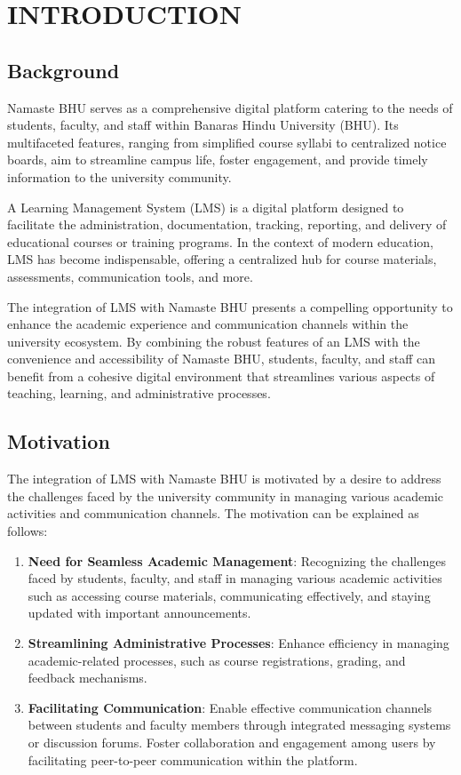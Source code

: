 \newpage
{}
\chapter{INTRODUCTION}



\section{Background}

Namaste BHU serves as a comprehensive digital platform catering to the needs of students, faculty, and staff within Banaras Hindu University (BHU). Its multifaceted features, ranging from simplified course syllabi to centralized notice boards, aim to streamline campus life, foster engagement, and provide timely information to the university community.

A Learning Management System (LMS) is a digital platform designed to facilitate the administration, documentation, tracking, reporting, and delivery of educational courses or training programs. In the context of modern education, LMS has become indispensable, offering a centralized hub for course materials, assessments, communication tools, and more.

The integration of LMS with Namaste BHU presents a compelling opportunity to enhance the academic experience and communication channels within the university ecosystem. By combining the robust features of an LMS with the convenience and accessibility of Namaste BHU, students, faculty, and staff can benefit from a cohesive digital environment that streamlines various aspects of teaching, learning, and administrative processes.

\section{Motivation}
The integration of LMS with Namaste BHU is motivated by a desire to address the challenges faced by the university community in managing various academic activities and communication channels. The motivation can be explained as follows:

\begin{enumerate}
    \item \textbf{Need for Seamless Academic Management}:
    Recognizing the challenges faced by students, faculty, and staff in managing various academic activities such as accessing course materials, communicating effectively, and staying updated with important announcements.
    \item \textbf{Streamlining Administrative Processes}:
    Enhance efficiency in managing academic-related processes, such as course registrations, grading, and feedback mechanisms.\\
    \item \textbf{Facilitating Communication}:
    Enable effective communication channels between students and faculty members through integrated messaging systems or discussion forums. Foster collaboration and engagement among users by facilitating peer-to-peer communication within the platform.
\end{enumerate}

